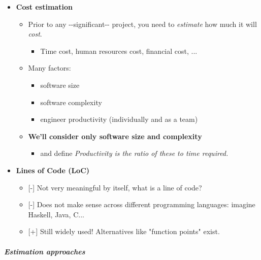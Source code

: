 \documentclass[a4paper]{article}
\providecommand{\tightlist}{%
  \setlength{\itemsep}{0pt}\setlength{\parskip}{0pt}}
\let\oldsubparagraph\subparagraph
\renewcommand{\subparagraph}[1]{\oldsubparagraph{#1}\mbox{}}
\begin{document}
\begin{itemize}
\item
  \textbf{Cost estimation}

  \begin{itemize}
  \tightlist
  \item
    Prior to any -\/-significant-\/- project, you need to
    \emph{estimate} how much it will \emph{cost}.

    \begin{itemize}
    \tightlist
    \item
      Time cost, human resources cost, financial cost, ...
    \end{itemize}
  \item
    Many factors:

    \begin{itemize}
    \tightlist
    \item
      software size
    \item
      software complexity
    \item
      engineer productivity (individually and as a team)
    \end{itemize}
  \item
    \textbf{We'll consider only software size and complexity}

    \begin{itemize}
    \tightlist
    \item
      and define \emph{Productivity is the ratio of these to time
      required.}
    \end{itemize}
  \end{itemize}
\item
  \textbf{Lines of Code (LoC)}

  \begin{itemize}
  \tightlist
  \item
    {[}-{]} Not very meaningful by itself, what is a line of code?
  \item
    {[}-{]} Does not make sense across different programming languages:
    imagine Haskell, Java, C...
  \item
    {[}+{]} Still widely used! Alternatives like "function points"
    exist.
  \end{itemize}
\end{itemize}

\hypertarget{estimation-approaches}{%
\subparagraph{\texorpdfstring{\textbf{Estimation
approaches}}{Estimation approaches}}\label{estimation-approaches}}
\end{document}
